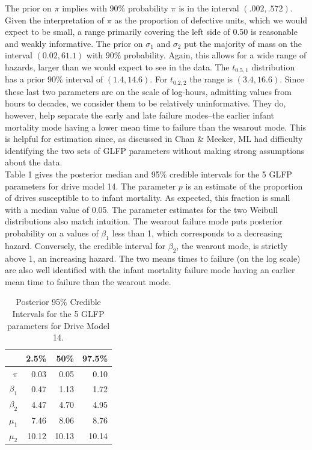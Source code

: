 \documentclass[12pt]{article}
\begin{document}
The prior on $\pi$ implies with $90\%$ probability $\pi$ is in the interval $(.002, .572)$.  Given the interpretation of $\pi$ as the proportion of defective units, which we would expect to be small, a range primarily covering the left side of 0.50 is reasonable and weakly informative.  The prior on $\sigma_1$ and $\sigma_2$ put the majority of mass on the interval $(0.02, 61.1)$ with $90\%$ probability.  Again, this allows for a wide range of hazards, larger than we would expect to see in the data.  The $t_{0.5,1}$ distribution has a prior $90\%$ interval of $(1.4,14.6)$. For $t_{0.2,2}$ the range is $(3.4,16.6)$. Since these last two parameters are on the scale of log-hours, admitting values from hours to decades, we consider them to be relatively uninformative.  They do, however, help separate the early and late failure modes--the earlier infant mortality mode having a lower mean time to failure than the wearout mode.  This is helpful for estimation since, as discussed in Chan \& Meeker, ML had difficulty identifying the two sets of GLFP parameters without making strong assumptions about the data.  \\


Table 1 gives the posterior median and 95\% credible intervals for the 5 GLFP parameters for drive model 14.  The parameter $p$ is an estimate of the proportion of drives susceptible to to infant mortality.  As expected, this fraction is small with a median value of 0.05.  The parameter estimates for the two Weibull distributions also match intuition.  The wearout failure mode puts posterior probability on a values of $\beta_1$ less than 1, which corresponds to a decreasing hazard.  Conversely, the credible interval for $\beta_2$, the wearout mode, is strictly above 1, an increasing hazard.  The two means times to failure (on the log scale) are also well identified with the infant mortality failure mode having an earlier mean time to failure than the wearout mode. 

\begin{table}[H]
\centering
\begin{tabular}{rrrr}
  \hline
 & 2.5\% & 50\% & 97.5\% \\ 
  \hline
$\pi$ & 0.03 & 0.05 & 0.10 \\ 
 $\beta_1$ & 0.47 & 1.13 & 1.72 \\ 
  $\beta_2$ & 4.47 & 4.70 & 4.95 \\ 
  $\mu_1$ & 7.46 & 8.06 & 8.76 \\ 
  $\mu_2$ & 10.12 & 10.13 & 10.14 \\ 
   \hline
\end{tabular}
\caption{Posterior 95\% Credible Intervals for the 5 GLFP parameters for Drive Model 14.}
\label{table:1}
\end{table}
\end{document}
